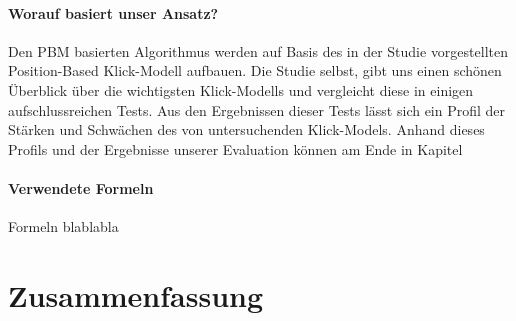 \paragraph{Worauf basiert unser Ansatz?}
Den PBM basierten Algorithmus werden auf Basis des in der Studie \cite{pbm} vorgestellten Position-Based Klick-Modell aufbauen. Die Studie selbst, gibt uns einen schönen Überblick über die wichtigsten Klick-Modells und vergleicht diese in einigen aufschlussreichen Tests. Aus den Ergebnissen dieser Tests lässt sich ein Profil der Stärken und Schwächen des von untersuchenden Klick-Models. Anhand dieses Profils und der Ergebnisse unserer Evaluation können am Ende in Kapitel 

\paragraph{Verwendete Formeln}
Formeln blablabla
\cite{pbmTutorial}


\section{Zusammenfassung}
\label{sec:Grundlagen:Zusammenfassung}